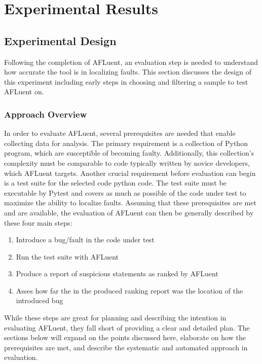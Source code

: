 \chapter{Experimental Results}
\label{ch:experiments}

\section{Experimental Design}
\label{sec:expiremental_design}

Following the completion of AFLuent, an evaluation step is needed to understand
how accurate the tool is in localizing faults. This section discusses the design
of this experiment including early steps in choosing and filtering a sample to
test AFLuent on.

\subsection{Approach Overview}
\label{subsec:approach_overview}

In order to evaluate AFLuent, several prerequisites are needed that enable
collecting data for analysis. The primary requirement is a collection of Python
program, which are susceptible of becoming faulty. Additionally, this
collection's complexity must be comparable to code typically written by novice
developers, which AFLuent targets. Another crucial requirement before evaluation
can begin is a test suite for the selected code python code. The test suite must
be executable by Pytest and covers as much as possible of the code under test to
maximize the ability to localize faults. Assuming that these prerequisites are
met and are available, the evaluation of AFLuent can then be generally described
by these four main steps:

\begin{enumerate}
    \item Introduce a bug/fault in the code under test
    \item Run the test suite with AFLuent
    \item Produce a report of suspicious statements as ranked by AFLuent
    \item Asses how far the in the produced ranking report was the location of
    the introduced bug
\end{enumerate}

While these steps are great for planning and describing the intention in evaluating
AFLuent, they fall short of providing a clear and detailed plan. The sections
below will expand on the points discussed here, elaborate on how the
prerequisites are met, and describe the systematic and automated approach in evaluation.

